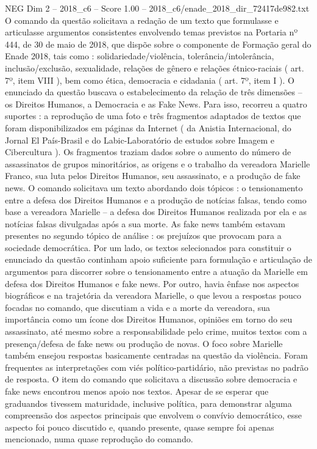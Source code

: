 \begin{textsample}{NEG Dim 2 – 2018\_c6 – Score 1.00 – 2018\_c6/enade\_2018\_dir\_72417de982.txt}
O comando da questão solicitava a redação de um texto que formulasse e articulasse argumentos consistentes envolvendo temas previstos na Portaria nº 444, de 30 de maio de 2018, que dispõe sobre o componente de Formação geral do Enade 2018, tais como : solidariedade/violência, tolerância/intolerância, inclusão/exclusão, sexualidade, relações de gênero e relações étnico-raciais ( art. 7º, item VIII ), bem como ética, democracia e cidadania ( art. 7º, item I ).
O enunciado da questão buscava o estabelecimento da relação de três dimensões – os Direitos Humanos, a Democracia e as Fake News.
Para isso, recorreu a quatro suportes : a reprodução de uma foto e três fragmentos adaptados de textos que foram disponibilizados em páginas da Internet ( da Anistia Internacional, do Jornal El País-Brasil e do Labic-Laboratório de estudos sobre Imagem e Cibercultura ).
Os fragmentos traziam dados sobre o aumento do número de assassinatos de grupos minoritários, as origens e o trabalho da vereadora Marielle Franco, sua luta pelos Direitos Humanos, seu assassinato, e a produção de fake news.
O comando solicitava um texto abordando dois tópicos : o tensionamento entre a defesa dos Direitos Humanos e a produção de notícias falsas, tendo como base a vereadora Marielle – a defesa dos Direitos Humanos realizada por ela e as notícias falsas divulgadas após a sua morte.
As fake news também estavam presentes no segundo tópico de análise : os prejuízos que provocam para a sociedade democrática.
Por um lado, os textos selecionados para constituir o enunciado da questão continham apoio suficiente para formulação e articulação de argumentos para discorrer sobre o tensionamento entre a atuação da Marielle em defesa dos Direitos Humanos e fake news.
Por outro, havia ênfase nos aspectos biográficos e na trajetória da vereadora Marielle, o que levou a respostas pouco focadas no comando, que discutiam a vida e a morte da vereadora, sua importância como um ícone dos Direitos Humanos, opiniões em torno do seu assassinato, até mesmo sobre a responsabilidade pelo crime, muitos textos com a presença/defesa de fake news ou produção de novas.
O foco sobre Marielle também ensejou respostas basicamente centradas na questão da violência.
Foram frequentes as interpretações com viés político-partidário, não previstas no padrão de resposta.
O item do comando que solicitava a discussão sobre democracia e fake news encontrou menos apoio nos textos.
Apesar de se esperar que graduandos tivessem maturidade, inclusive política, para demonstrar alguma compreensão dos aspectos principais que envolvem o convívio democrático, esse aspecto foi pouco discutido e, quando presente, quase sempre foi apenas mencionado, numa quase reprodução do comando.

\end{textsample}
